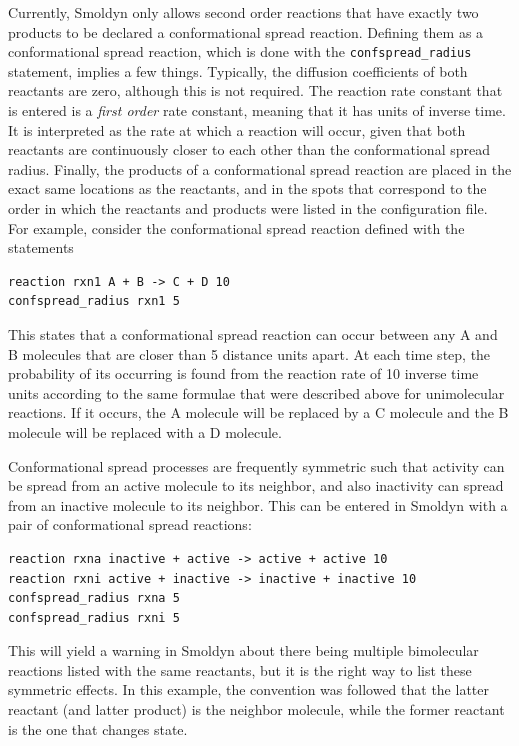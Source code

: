 \documentclass {scrbook}
\newcommand {\ttt} {\texttt}
\begin{document}
Currently, Smoldyn only allows second order reactions that have exactly two products to be declared a conformational spread reaction. Defining them as a conformational spread reaction, which is done with the \ttt{confspread\_radius} statement, implies a few things. Typically, the diffusion coefficients of both reactants are zero, although this is not required. The reaction rate constant that is entered is a \textit{first order} rate constant, meaning that it has units of inverse time. It is interpreted as the rate at which a reaction will occur, given that both reactants are continuously closer to each other than the conformational spread radius. Finally, the products of a conformational spread reaction are placed in the exact same locations as the reactants, and in the spots that correspond to the order in which the reactants and products were listed in the configuration file. For example, consider the conformational spread reaction defined with the statements
\begin{lstlisting}[style=SSAC]
reaction rxn1 A + B -> C + D 10
confspread_radius rxn1 5
\end{lstlisting}
This states that a conformational spread reaction can occur between any A and B molecules that are closer than 5 distance units apart. At each time step, the probability of its occurring is found from the reaction rate of 10 inverse time units according to the same formulae that were described above for unimolecular reactions. If it occurs, the A molecule will be replaced by a C molecule and the B molecule will be replaced with a D molecule.

Conformational spread processes are frequently symmetric such that activity can be spread from an active molecule to its neighbor, and also inactivity can spread from an inactive molecule to its neighbor. This can be entered in Smoldyn with a pair of conformational spread reactions:
\begin{lstlisting}[style=SSAC]
reaction rxna inactive + active -> active + active 10
reaction rxni active + inactive -> inactive + inactive 10
confspread_radius rxna 5
confspread_radius rxni 5
\end{lstlisting}
This will yield a warning in Smoldyn about there being multiple bimolecular reactions listed with the same reactants, but it is the right way to list these symmetric effects. In this example, the convention was followed that the latter reactant (and latter product) is the neighbor molecule, while the former reactant is the one that changes state.
\end{document}
